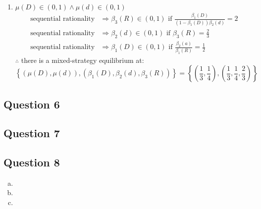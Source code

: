 \documentclass{article}
\begin{document}
\begin{enumerate}
	\item $\mu(D)\in(0,1)\land \mu(d)\in(0,1)$
		\begin{align*}
			\text{sequential rationality} 	&\Rightarrow \beta_3(R)\in(0,1) \text{ if } \frac{\beta_1(D)}{(1-\beta_1(D))\beta_2(d)}= 2\\
			\text{sequential rationality} 	&\Rightarrow \beta_2(d)\in(0,1)	\text{ if } \beta_3(R)=\frac{2}{3} \\
			\text{sequential rationality} 	&\Rightarrow \beta_1(D)\in(0,1)	\text{ if } \frac{\beta_2(a)}{\beta_1(R)}=\frac{1}{2}	
		\end{align*}
		$\therefore$ there is a mixed-strategy equilibrium at:
		\[
			\left\{\left(\mu(D),\mu(d)\right),\left(\beta_1(D),\beta_2(d),\beta_3(R)\right)\right\} 
				= \left\{\left(\frac{1}{3},\frac{1}{4}\right),\left(\frac{1}{3},\frac{1}{4},\frac{2}{3}\right)\right\}
		\]
\end{enumerate}






\subsection*{Question 6}


	



\subsection*{Question 7}


	



\subsection*{Question 8}

\begin{enumerate}[(a)]
	\item 
	
	\item 
	
	\item 
	
\end{enumerate}


	


\end{document}
